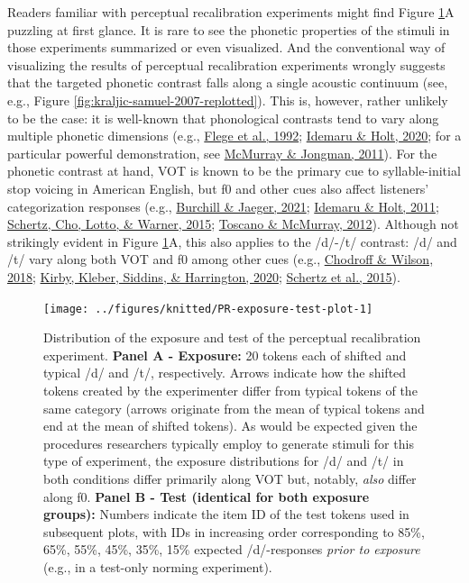 \documentclass[
  11pt,
  man,floatsintext]{apa6}
\begin{document}
Readers familiar with perceptual recalibration experiments might find Figure \ref{fig:PR-exposure-test-plot}A puzzling at first glance. It is rare to see the phonetic properties of the stimuli in those experiments summarized or even visualized. And the conventional way of visualizing the results of perceptual recalibration experiments wrongly suggests that the targeted phonetic contrast falls along a single acoustic continuum (see, e.g., Figure \ref{fig:kraljic-samuel-2007-replotted}). This is, however, rather unlikely to be the case: it is well-known that phonological contrasts tend to vary along multiple phonetic dimensions (e.g., \protect\hyperlink{ref-flege1992}{Flege et al., 1992}; \protect\hyperlink{ref-idemaru-holt2020}{Idemaru \& Holt, 2020}; for a particular powerful demonstration, see \protect\hyperlink{ref-mcmurray-jongman2011}{McMurray \& Jongman, 2011}). For the phonetic contrast at hand, VOT is known to be the primary cue to syllable-initial stop voicing in American English, but f0 and other cues also affect listeners' categorization responses (e.g., \protect\hyperlink{ref-burchill-jaeger2022}{Burchill \& Jaeger, 2021}; \protect\hyperlink{ref-idemaru-holt2011}{Idemaru \& Holt, 2011}; \protect\hyperlink{ref-schertz2015}{Schertz, Cho, Lotto, \& Warner, 2015}; \protect\hyperlink{ref-toscano-mcmurray2012}{Toscano \& McMurray, 2012}).
Although not strikingly evident in Figure \ref{fig:PR-exposure-test-plot}A, this also applies to the /d/-/t/ contrast: /d/ and /t/ vary along both VOT and f0 among other cues (e.g., \protect\hyperlink{ref-chodroff-wilson2018}{Chodroff \& Wilson, 2018}; \protect\hyperlink{ref-kirby2020}{Kirby, Kleber, Siddins, \& Harrington, 2020}; \protect\hyperlink{ref-schertz2015}{Schertz et al., 2015}).\\



\begin{figure}

{\centering \texttt{[image: ../figures/knitted/PR-exposure-test-plot-1]} 

}

\caption{Distribution of the exposure and test of the perceptual recalibration experiment. \textbf{Panel A - Exposure:} 20 tokens each of shifted and typical /d/ and /t/, respectively. Arrows indicate how the shifted tokens created by the experimenter differ from typical tokens of the same category (arrows originate from the mean of typical tokens and end at the mean of shifted tokens). As would be expected given the procedures researchers typically employ to generate stimuli for this type of experiment, the exposure distributions for /d/ and /t/ in both conditions differ primarily along VOT but, notably, \emph{also} differ along f0. \textbf{Panel B - Test (identical for both exposure groups):} Numbers indicate the item ID of the test tokens used in subsequent plots, with IDs in increasing order corresponding to 85\%, 65\%, 55\%, 45\%, 35\%, 15\% expected /d/-responses \emph{prior to exposure} (e.g., in a test-only norming experiment).}\label{fig:PR-exposure-test-plot}
\end{figure}
\end{document}
